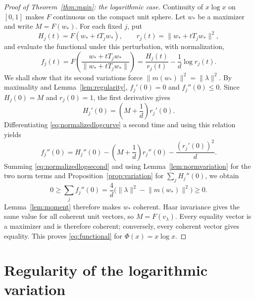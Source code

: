 \documentclass[11pt,reqno]{amsart}
\numberwithin{equation}{section}
\theoremstyle{plain}
\theoremstyle{remark}
\newcommand{\norm}[1]{\lVert#1\rVert}
\begin{document}
\begin{proof}[Proof of Theorem~\ref{thm:main}: the logarithmic case]
Continuity of $x\log x$ on $[0,1]$ makes $F$ continuous on the compact
unit sphere. Let $w_*$ be a maximizer and write $M=F(w_*)$.
For each fixed $j$, put
\[
 H_j(t)=F(w_*+tT_jw_*),\qquad r_j(t)=\norm{w_*+tT_jw_*}^2,
\]
and evaluate the functional under this perturbation, with normalization,
\begin{equation}\label{eq:normalizedlogcurve}
 f_j(t)=F\!\left(\frac{w_*+tT_jw_*}{\norm{w_*+tT_jw_*}}\right)
       =\frac{H_j(t)}{r_j(t)}-\frac1d\log r_j(t).
\end{equation}
We shall show that its second variations force
$\norm{m(w_*)}^2=\norm{\lambda}^2$.
By maximality and Lemma~\ref{lem:regularity},
$f_j'(0)=0$ and $f_j''(0)\le0$. Since $H_j(0)=M$ and $r_j(0)=1$,
the first derivative gives
\[
 H_j'(0)=\left(M+\frac1d\right)r_j'(0).
\]
Differentiating \eqref{eq:normalizedlogcurve} a second time and using
this relation yields
\begin{equation}\label{eq:normalizedlogsecond}
 f_j''(0)=H_j''(0)-\left(M+\frac1d\right)r_j''(0)
                   -\frac{(r_j'(0))^2}{d}.
\end{equation}
Summing \eqref{eq:normalizedlogsecond} and using
Lemma~\ref{lem:normvariation} for the two norm terms and
Proposition~\ref{prop:variation} for $\sum_jH_j''(0)$, we obtain
\begin{equation}\label{eq:entropycontact}
 0\ge\sum_jf_j''(0)
   =\frac4d\bigl(\norm{\lambda}^2-\norm{m(w_*)}^2\bigr)\ge0.
\end{equation}
Lemma~\ref{lem:moment} therefore makes $w_*$ coherent.
Haar invariance gives the same value for all coherent unit vectors,
so $M=F(v_\lambda)$. Every equality vector is a maximizer and is
therefore coherent; conversely, every coherent vector gives equality.
This proves \eqref{eq:functional} for $\Phi(x)=x\log x$.
\end{proof}

\appendix
\section{Regularity of the logarithmic variation}\label{app:regularity}
\end{document}
